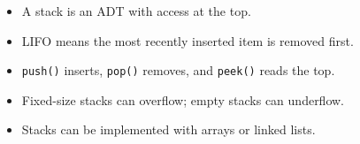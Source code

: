 \begin{chapterrecap}
\begin{itemize}
  \item A stack is an ADT with access at the top.
  \item LIFO means the most recently inserted item is removed first.
  \item \texttt{push()} inserts, \texttt{pop()} removes, and \texttt{peek()} reads the top.
  \item Fixed-size stacks can overflow; empty stacks can underflow.
  \item Stacks can be implemented with arrays or linked lists.
\end{itemize}
\end{chapterrecap}


